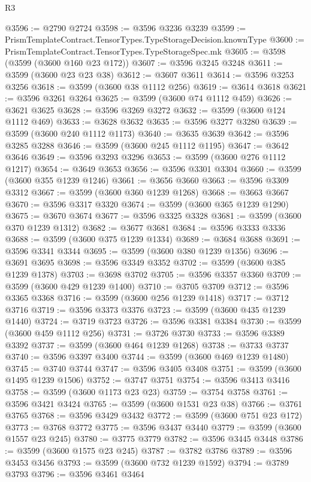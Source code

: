 \begin{lexlean}{R3}
\begin{coremodule}
@3596 := @2790 @2724
@3598 := @3596 @3236 @3239
@3599 := PrismTemplateContract.TensorTypes.TypeStorageDecision.knownType
@3600 := PrismTemplateContract.TensorTypes.TypeStorageSpec.mk
@3605 := @3598 (@3599 (@3600 @160 @23 @172))
@3607 := @3596 @3245 @3248
@3611 := @3599 (@3600 @23 @23 @38)
@3612 := @3607 @3611
@3614 := @3596 @3253 @3256
@3618 := @3599 (@3600 @38 @1112 @256)
@3619 := @3614 @3618
@3621 := @3596 @3261 @3264
@3625 := @3599 (@3600 @74 @1112 @459)
@3626 := @3621 @3625
@3628 := @3596 @3269 @3272
@3632 := @3599 (@3600 @124 @1112 @469)
@3633 := @3628 @3632
@3635 := @3596 @3277 @3280
@3639 := @3599 (@3600 @240 @1112 @1173)
@3640 := @3635 @3639
@3642 := @3596 @3285 @3288
@3646 := @3599 (@3600 @245 @1112 @1195)
@3647 := @3642 @3646
@3649 := @3596 @3293 @3296
@3653 := @3599 (@3600 @276 @1112 @1217)
@3654 := @3649 @3653
@3656 := @3596 @3301 @3304
@3660 := @3599 (@3600 @355 @1239 @1246)
@3661 := @3656 @3660
@3663 := @3596 @3309 @3312
@3667 := @3599 (@3600 @360 @1239 @1268)
@3668 := @3663 @3667
@3670 := @3596 @3317 @3320
@3674 := @3599 (@3600 @365 @1239 @1290)
@3675 := @3670 @3674
@3677 := @3596 @3325 @3328
@3681 := @3599 (@3600 @370 @1239 @1312)
@3682 := @3677 @3681
@3684 := @3596 @3333 @3336
@3688 := @3599 (@3600 @375 @1239 @1334)
@3689 := @3684 @3688
@3691 := @3596 @3341 @3344
@3695 := @3599 (@3600 @380 @1239 @1356)
@3696 := @3691 @3695
@3698 := @3596 @3349 @3352
@3702 := @3599 (@3600 @385 @1239 @1378)
@3703 := @3698 @3702
@3705 := @3596 @3357 @3360
@3709 := @3599 (@3600 @429 @1239 @1400)
@3710 := @3705 @3709
@3712 := @3596 @3365 @3368
@3716 := @3599 (@3600 @256 @1239 @1418)
@3717 := @3712 @3716
@3719 := @3596 @3373 @3376
@3723 := @3599 (@3600 @435 @1239 @1440)
@3724 := @3719 @3723
@3726 := @3596 @3381 @3384
@3730 := @3599 (@3600 @459 @1112 @256)
@3731 := @3726 @3730
@3733 := @3596 @3389 @3392
@3737 := @3599 (@3600 @464 @1239 @1268)
@3738 := @3733 @3737
@3740 := @3596 @3397 @3400
@3744 := @3599 (@3600 @469 @1239 @1480)
@3745 := @3740 @3744
@3747 := @3596 @3405 @3408
@3751 := @3599 (@3600 @1495 @1239 @1506)
@3752 := @3747 @3751
@3754 := @3596 @3413 @3416
@3758 := @3599 (@3600 @1173 @23 @23)
@3759 := @3754 @3758
@3761 := @3596 @3421 @3424
@3765 := @3599 (@3600 @1531 @23 @38)
@3766 := @3761 @3765
@3768 := @3596 @3429 @3432
@3772 := @3599 (@3600 @751 @23 @172)
@3773 := @3768 @3772
@3775 := @3596 @3437 @3440
@3779 := @3599 (@3600 @1557 @23 @245)
@3780 := @3775 @3779
@3782 := @3596 @3445 @3448
@3786 := @3599 (@3600 @1575 @23 @245)
@3787 := @3782 @3786
@3789 := @3596 @3453 @3456
@3793 := @3599 (@3600 @732 @1239 @1592)
@3794 := @3789 @3793
@3796 := @3596 @3461 @3464

\end{coremodule}
\end{lexlean}
